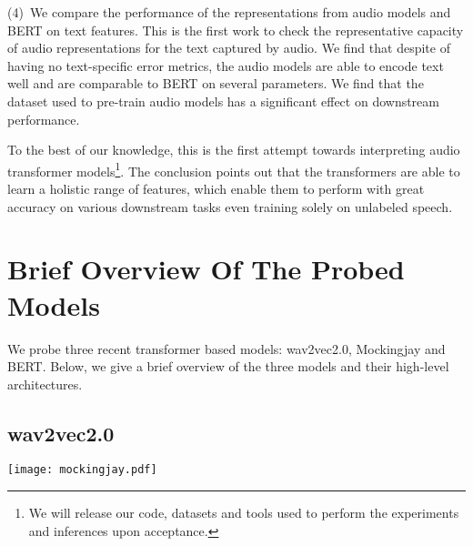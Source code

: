 \documentclass[sigconf]{acmart}
\newcommand{\wv}{wav2vec2.0\xspace}
\newcommand{\mj}{Mockingjay\xspace}
\begin{document}
(4)~We compare the performance of the representations from audio models and BERT on text features. %
This is the first work to check the representative capacity of audio representations for the text captured by audio. We find that despite of having no text-specific error metrics, the audio models are able to encode text well and are comparable to BERT on several parameters. We find that the dataset used to pre-train audio models has a significant effect on downstream performance. %

To the best of our knowledge, this is the first attempt towards interpreting audio transformer models\footnote{We will release our code, datasets and tools used to perform the experiments and inferences upon acceptance.}. The conclusion points out that the transformers are able to learn a holistic range of features, which enable them to perform with great accuracy on various downstream tasks even training solely on unlabeled speech. 

\section{Brief Overview Of The Probed Models}
\label{sec:Brief Overview Of The Probed Models}
We probe three recent transformer based models: \wv, \mj and BERT. Below, we give a brief overview of the three models and their high-level architectures.
\subsection{wav2vec2.0}
\label{sec:wav2vec2.0}

\begin{figure*}
  \texttt{[image: mockingjay.pdf]}
  \caption{Mockingjay Architecture}
\end{figure*}
\end{document}
